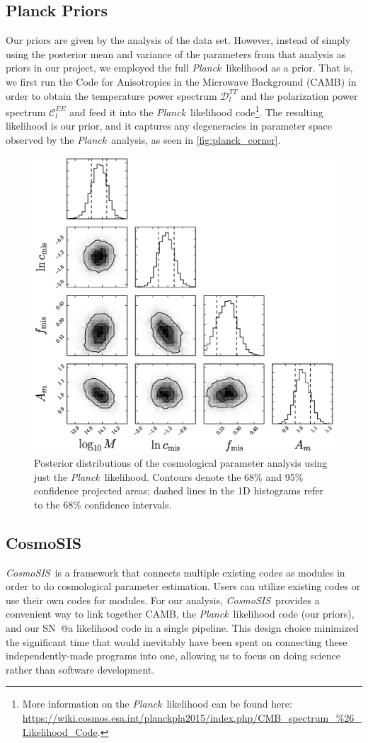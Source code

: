 \documentclass[12pt,a4paper]{article}
\makeatletter
\newcommand\TM[1]{\todo[color=green!40, inline, size=\small]{TM: #1}}
\newcommand\Planck{{\it Planck}\ }
\newcommand\CosmoSIS{{\it CosmoSIS}\ }
\newcommand*{\rom}[1]{\expandafter\@slowromancap\romannumeral #1@}
\newcommand{\sna}{\mbox{SN \rom{1}a}}
\makeatother
\begin{document}
\subsection{Planck Priors}
\label{sec:planck_priors}
Our priors are given by the analysis of the \citet{planck2013} data set.
However, instead of simply using the posterior mean and variance of
the parameters from that analysis as priors in our project, we
employed the full \Planck likelihood as a prior. That is,
we first run the Code for Anisotropies in the Microwave Background (CAMB)
in order to obtain the temperature power spectrum $\mathcal{D}_l^{TT}$
and the polarization power spectrum $\mathcal{C}_l^{EE}$
and feed it into the \Planck likelihood code\footnote{More information
on the \Planck likelihood can be found here: 
\url{https://wiki.cosmos.esa.int/planckpla2015/index.php/CMB_spectrum_\%26_Likelihood_Code}.}.
The resulting likelihood
is our prior, and it captures any degeneracies in parameter space
observed by the \Planck analysis, as seen in \autoref{fig:planck_corner}. 
%
\begin{figure}
  \centering
  \includegraphics[width=0.5\linewidth]{figures/corner_example.eps}
  \caption{Posterior distributions of the cosmological parameter
    analysis using just the \Planck likelihood. Contours denote the
    68\% and 95\% confidence projected areas; dashed lines in
    the 1D histograms refer to the 68\% confidence intervals.}
  \label{fig:planck_corner}
\TM{THIS IS A PLACE HOLDER PLOT!} 
\end{figure}
%

\subsection{CosmoSIS}
\label{sec:CosmoSIS}
\CosmoSIS is a framework that connects multiple existing codes as 
modules in order to do cosmological parameter estimation. Users 
can utilize existing codes or use their own codes for modules. For 
our analysis, \CosmoSIS provides a convenient way to link together 
CAMB, the \Planck likelihood code (our priors), and our {\sna} likelihood 
code in a single pipeline. This design choice minimized the significant
time that would inevitably have been spent on connecting these 
independently-made programs into one, allowing us to focus on 
doing science rather than software development.
\end{document}
